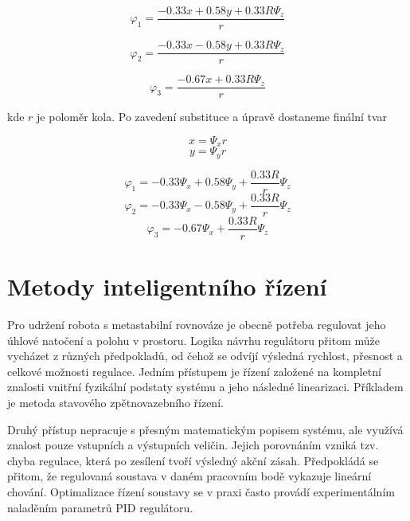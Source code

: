 \begin{equation}
\varphi_{1}=\frac{-0.33x + 0.58y + 0.33R\Psi_{z}}{r}
\end{equation}

\begin{equation}
\varphi_{2}=\frac{-0.33x - 0.58y + 0.33R\Psi_{z}}{r}
\end{equation}

\begin{equation}
\varphi_{3}=\frac{-0.67x + 0.33R\Psi_{z}}{r}
\end{equation}\vspace{3mm}

\noindent kde $r$ je poloměr kola. Po zavedení substituce a úpravě dostaneme finální tvar

$$x=\Psi_{x}r$$
$$y=\Psi_{y}r$$

\begin{equation}
\varphi_{1}=-0.33\Psi_{x} + 0.58\Psi_{y} + \frac{0.33R}{r}\Psi_{z}
\end{equation}
\begin{equation}
\varphi_{2}=-0.33\Psi_{x} - 0.58\Psi_{y} + \frac{0.33R}{r}\Psi_{z}
\end{equation}
\begin{equation}
\varphi_{3}=-0.67\Psi_{x} + \frac{0.33R}{r}\Psi_{z}
\end{equation}
   

\section{Metody inteligentního řízení}
\label{rizeni}

Pro udržení robota s metastabilní rovnováze je obecně potřeba regulovat jeho úhlové natočení a polohu v prostoru. Logika návrhu regulátoru přitom může vycházet z různých předpokladů, od čehož se odvíjí výsledná rychlost, přesnost a celkové možnosti regulace. Jedním přístupem je řízení založené na kompletní znalosti vnitřní fyzikální podstaty systému a jeho následné linearizaci. Příkladem je metoda stavového zpětnovazebního řízení. 

Druhý přístup nepracuje s přesným matematickým popisem systému, ale využívá znalost pouze vstupních a výstupních veličin. Jejich porovnáním vzniká tzv. chyba regulace, která po zesílení tvoří výsledný akční zásah. Předpokládá se přitom, že regulovaná soustava v daném pracovním bodě vykazuje lineární chování. Optimalizace řízení soustavy se v praxi často provádí experimentálním naladěním parametrů PID regulátoru.

